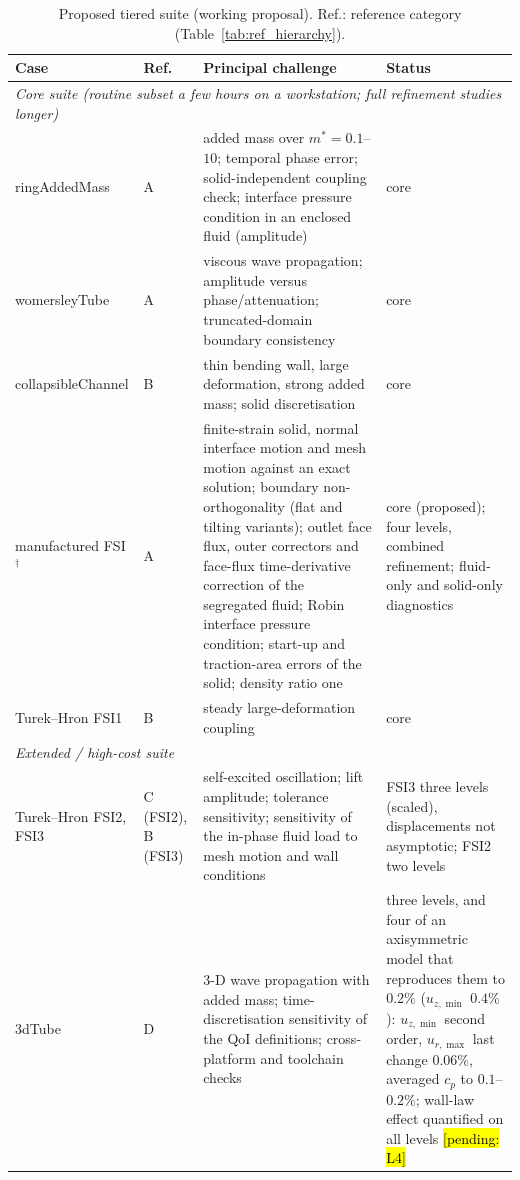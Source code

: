 \begin{table}[htbp]
	\centering
	\footnotesize
	\setlength{\tabcolsep}{3pt}
	\caption{Proposed tiered suite (working proposal). Ref.: reference category (Table~\ref{tab:ref_hierarchy}).}
	\label{tab:suite_tiers}
	\begin{tabular}{p{2.8cm}p{1.1cm}p{6.3cm}p{3.4cm}}
		\toprule
		Case & Ref. & Principal challenge & Status \\
		\midrule
		\multicolumn{4}{l}{\emph{Core suite (routine subset a few hours on a workstation; full refinement studies longer)}} \\
		ringAddedMass & A & added mass over $m^* = 0.1$--$10$; temporal phase error; solid-independent coupling check; interface pressure condition in an enclosed fluid (amplitude) & core \\
		womersleyTube & A & viscous wave propagation; amplitude versus phase/attenuation; truncated-domain boundary consistency & core \\
		collapsibleChannel & B & thin bending wall, large deformation, strong added mass; solid discretisation & core \\
		manufactured FSI$^\dagger$ & A & finite-strain solid, normal interface motion and mesh motion against an exact solution; boundary non-orthogonality (flat and tilting variants); outlet face flux, outer correctors and face-flux time-derivative correction of the segregated fluid; Robin interface pressure condition; start-up and traction-area errors of the solid; density ratio one & core (proposed); four levels, combined refinement; fluid-only and solid-only diagnostics \\
		Turek--Hron FSI1 & B & steady large-deformation coupling & core \\
		\midrule
		\multicolumn{4}{l}{\emph{Extended / high-cost suite}} \\
		Turek--Hron FSI2, FSI3 & C (FSI2), B (FSI3) & self-excited oscillation; lift amplitude; tolerance sensitivity; sensitivity of the in-phase fluid load to mesh motion and wall conditions & FSI3 three levels (scaled), displacements not asymptotic; FSI2 two levels \\
		3dTube & D & 3-D wave propagation with added mass; time-discretisation sensitivity of the QoI definitions; cross-platform and toolchain checks & three levels, and four of an axisymmetric model that reproduces them to $0.2\%$ ($u_{z,\min}$ $0.4\%$): $u_{z,\min}$ second order, $u_{r,\max}$ last change $0.06\%$, averaged $c_p$ to $0.1$--$0.2\%$; wall-law effect quantified on all levels \hl{[pending: L4]} \\

\end{tabular}
\end{table}
